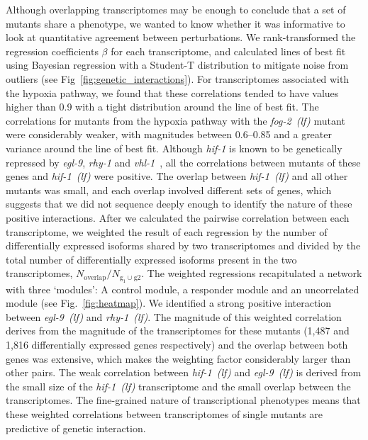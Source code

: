 \documentclass[9pt,twocolumn,twoside]{pnas-new}
\newcommand{\gene}[1]{\emph{#1}}
\newcommand{\fog}{\emph{fog-2~(lf)}}
\newcommand{\egl}{\emph{egl-9~(lf)}}
\newcommand{\rhy}{\emph{rhy-1~(lf)}}
\newcommand{\vhl}{\emph{vhl-1~(lf)}}
\newcommand{\hif}{\emph{hif-1~(lf)}}
\newcommand{\egln}{1,487}
\newcommand{\rhyn}{1,816}
\begin{document}
Although overlapping transcriptomes may be enough to conclude that a set of mutants
share a phenotype, we wanted to know whether it was informative to
look at quantitative agreement between perturbations. We rank-transformed
the regression coefficients $\beta$ for each transcriptome, and calculated lines
of best fit using Bayesian regression with a Student-T distribution to mitigate
noise from outliers (see Fig~\ref{fig:genetic_interactions}). For transcriptomes
associated with the hypoxia pathway, we found that these correlations tended to have
values higher than 0.9 with a tight distribution around the line of best fit.
The correlations for mutants from the hypoxia pathway
with the \fog{} mutant were considerably weaker, with magnitudes between
0.6--0.85 and a greater variance around the line of best fit.
Although \gene{hif-1} is known to be genetically repressed by \gene{egl-9}, \gene{rhy-1} and
\gene{vhl-1}~\cite{Epstein2001,Shen2006}, all the correlations
between mutants of these genes and \hif{} were positive. The overlap between
\hif{} and all other mutants was small, and each overlap involved
different sets of genes, which suggests that we did not sequence deeply enough
to identify the nature of these positive interactions.
After we calculated the pairwise correlation between each transcriptome,
we weighted the result of each regression by the
number of differentially expressed isoforms shared by two transcriptomes and
divided by the total number of differentially expressed isoforms present in the
two transcriptomes, $N_\mathrm{overlap}/N_{\mathrm{g_1} \cup \mathrm{g2}}$.
The weighted regressions recapitulated a network with three `modules': A control
module, a responder module and an uncorrelated module (see Fig.~\ref{fig:heatmap}).
We identified a strong positive interaction between \egl{} and \rhy{}.
The magnitude of this weighted correlation derives from the magnitude of the
transcriptomes for these mutants (\egln{} and \rhyn{} differentially expressed
genes respectively) and the overlap between both genes was
extensive, which makes the weighting factor considerably larger than other pairs.
The weak correlation between \hif{} and \egl{} is derived from the small size of
the \hif{} transcriptome and the small overlap between the transcriptomes.
The fine-grained nature of transcriptional phenotypes means that these weighted
correlations between transcriptomes of single mutants are predictive of genetic
interaction.
\end{document}
